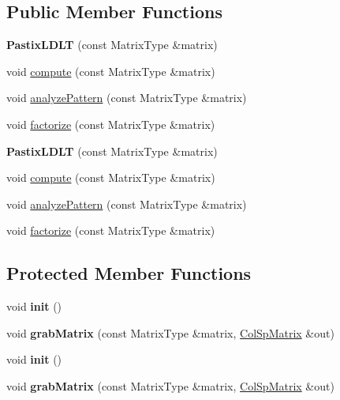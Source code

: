 \subsection*{Public Member Functions}
\begin{DoxyCompactItemize}
\item 
\mbox{\label{class_eigen_1_1_pastix_l_d_l_t_a80904e8c41154d6c0807765436b21e62}} 
{\bfseries Pastix\+L\+D\+LT} (const Matrix\+Type \&matrix)
\item 
void \hyperlink{class_eigen_1_1_pastix_l_d_l_t_abf3135c2dc17d9df26fef80e6456a691}{compute} (const Matrix\+Type \&matrix)
\item 
void \hyperlink{class_eigen_1_1_pastix_l_d_l_t_a01947862303ca404b9ce5033751a221b}{analyze\+Pattern} (const Matrix\+Type \&matrix)
\item 
void \hyperlink{class_eigen_1_1_pastix_l_d_l_t_a182b0ee676a131413363cc73bc309ef7}{factorize} (const Matrix\+Type \&matrix)
\item 
\mbox{\label{class_eigen_1_1_pastix_l_d_l_t_a80904e8c41154d6c0807765436b21e62}} 
{\bfseries Pastix\+L\+D\+LT} (const Matrix\+Type \&matrix)
\item 
void \hyperlink{class_eigen_1_1_pastix_l_d_l_t_abf3135c2dc17d9df26fef80e6456a691}{compute} (const Matrix\+Type \&matrix)
\item 
void \hyperlink{class_eigen_1_1_pastix_l_d_l_t_a01947862303ca404b9ce5033751a221b}{analyze\+Pattern} (const Matrix\+Type \&matrix)
\item 
void \hyperlink{class_eigen_1_1_pastix_l_d_l_t_a182b0ee676a131413363cc73bc309ef7}{factorize} (const Matrix\+Type \&matrix)
\end{DoxyCompactItemize}
\subsection*{Protected Member Functions}
\begin{DoxyCompactItemize}
\item 
\mbox{\label{class_eigen_1_1_pastix_l_d_l_t_adb8dab54456c5c7c851a4df86be44009}} 
void {\bfseries init} ()
\item 
\mbox{\label{class_eigen_1_1_pastix_l_d_l_t_a5999da01d22c5c2db69d8ab7858b8cd0}} 
void {\bfseries grab\+Matrix} (const Matrix\+Type \&matrix, \hyperlink{group___sparse_core___module}{Col\+Sp\+Matrix} \&out)
\item 
\mbox{\label{class_eigen_1_1_pastix_l_d_l_t_adb8dab54456c5c7c851a4df86be44009}} 
void {\bfseries init} ()
\item 
\mbox{\label{class_eigen_1_1_pastix_l_d_l_t_a5999da01d22c5c2db69d8ab7858b8cd0}} 
void {\bfseries grab\+Matrix} (const Matrix\+Type \&matrix, \hyperlink{group___sparse_core___module}{Col\+Sp\+Matrix} \&out)
\end{DoxyCompactItemize}
